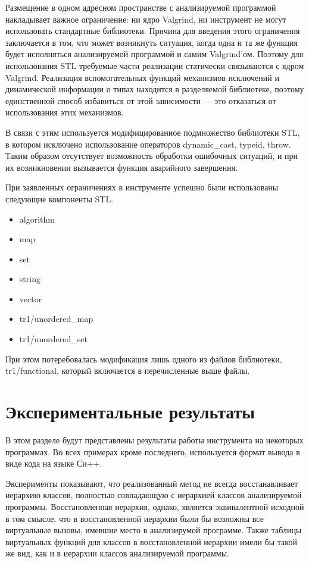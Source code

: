 \documentclass[a4paper,12pt,russian]{article}
\newcommand{\code}[1]{\textsf{#1}}
\begin{document}
Размещение в одном адресном пространстве с анализируемой программой накладывает важное ограничение: ни ядро \code{Valgrind}, ни инструмент не могут использовать стандартные библиотеки.
Причина для введения этого ограничения заключается в том, что может возникнуть ситуация, когда одна и та же функция будет исполняться анализируемой программой и самим \code{Valgrind}'ом.
Поэтому для использования \code{STL} требуемые части реализации статически связываются с ядром \code{Valgrind}.
Реализация вспомогательных функций механизмов исключений и динамической информации о типах находится в разделяемой библиотеке, поэтому единственной способ избавиться от этой зависимости --- это отказаться от использования этих механизмов.

В связи с этим используется модифицированное подмножество библиотеки \code{STL}, в котором исключено использование операторов \code{dynamic\_cast}, \code{typeid}, \code{throw}. Таким образом отсутствует возможность обработки ошибочных ситуаций, и при их возникновении вызывается функция аварийного завершения.

При заявленных ограничениях в инструменте успешно были использованы следующие компоненты \code{STL}.
\begin{itemize}
    \item \code{algorithm}
    \item \code{map}
    \item \code{set}
    \item \code{string}
    \item \code{vector}
    \item \code{tr1/unordered\_map}
    \item \code{tr1/unordered\_set}
\end{itemize}
При этом потеребовалась модификация лишь одного из файлов библиотеки, \code{tr1/functional}, который включается в перечисленные выше файлы.

\newpage
\section{Экспериментальные результаты}
В этом разделе будут представлены результаты работы инструмента на некоторых программах. Во всех примерах кроме последнего, используется формат вывода в виде кода на языке Си++.

Эксперименты показывают, что реализованный метод не всегда восстанавливает иерархию классов, полностью совпадающую с иерархией классов анализируемой программы.
Восстановленная иерархия, однако, является эквивалентной исходной в том смысле, что в восстановленной иерархии были бы возножны все виртуальные вызовы, имевшие место в анализирумой программе.
Также таблицы виртуальных функций для классов в восстановленной иерархии имели бы такой же вид, как и в иерархии классов анализируемой программы.
\end{document}
